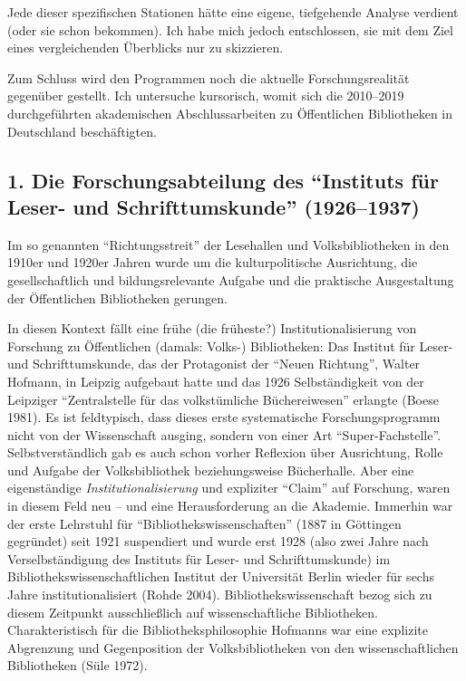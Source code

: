 \documentclass[a4paper,
fontsize=11pt,
oneside,
numbers=noperiodatend,
parskip=half-,
bibliography=totoc,
final
]{scrartcl}
\begin{document}
Jede dieser spezifischen Stationen hätte eine eigene, tiefgehende
Analyse verdient (oder sie schon bekommen). Ich habe mich jedoch
entschlossen, sie mit dem Ziel eines vergleichenden Überblicks nur zu
skizzieren.

Zum Schluss wird den Programmen noch die aktuelle Forschungsrealität
gegenüber gestellt. Ich untersuche kursorisch, womit sich die 2010--2019
durchgeführten akademischen Abschlussarbeiten zu Öffentlichen
Bibliotheken in Deutschland beschäftigten.

\hypertarget{die-forschungsabteilung-des-instituts-fuxfcr-leser--und-schrifttumskunde-19261937}{%
\subsection{\texorpdfstring{1. Die Forschungsabteilung des
\enquote{Instituts für Leser- und Schrifttumskunde}
(1926--1937)}{1. Die Forschungsabteilung des ``Instituts für Leser- und Schrifttumskunde'' (1926--1937)}}\label{die-forschungsabteilung-des-instituts-fuxfcr-leser--und-schrifttumskunde-19261937}}

Im so genannten \enquote{Richtungsstreit} der Lesehallen und
Volksbibliotheken in den 1910er und 1920er Jahren wurde um die
kulturpolitische Ausrichtung, die gesellschaftlich und bildungsrelevante
Aufgabe und die praktische Ausgestaltung der Öffentlichen Bibliotheken
gerungen.

In diesen Kontext fällt eine frühe (die früheste?) Institutionalisierung
von Forschung zu Öffentlichen (damals: Volks-) Bibliotheken: Das
Institut für Leser- und Schrifttumskunde, das der Protagonist der
\enquote{Neuen Richtung}, Walter Hofmann, in Leipzig aufgebaut hatte und
das 1926 Selbständigkeit von der Leipziger \enquote{Zentralstelle für
das volkstümliche Büchereiwesen} erlangte (Boese 1981). Es ist
feldtypisch, dass dieses erste systematische Forschungsprogramm nicht
von der Wissenschaft ausging, sondern von einer Art
\enquote{Super-Fachstelle}. Selbstverständlich gab es auch schon vorher
Reflexion über Ausrichtung, Rolle und Aufgabe der Volksbibliothek
beziehungsweise Bücherhalle. Aber eine eigenständige
\emph{Institutionalisierung} und expliziter \enquote{Claim} auf
Forschung, waren in diesem Feld neu -- und eine Herausforderung an die
Akademie. Immerhin war der erste Lehrstuhl für
\enquote{Bibliothekswissenschaften} (1887 in Göttingen gegründet) seit
1921 suspendiert und wurde erst 1928 (also zwei Jahre nach
Verselbständigung des Instituts für Leser- und Schrifttumskunde) im
Bibliothekswissenschaftlichen Institut der Universität Berlin wieder für
sechs Jahre institutionalisiert (Rohde 2004). Bibliothekswissenschaft
bezog sich zu diesem Zeitpunkt ausschließlich auf wissenschaftliche
Bibliotheken. Charakteristisch für die Bibliotheksphilosophie Hofmanns
war eine explizite Abgrenzung und Gegenposition der Volksbibliotheken
von den wissenschaftlichen Bibliotheken (Süle 1972).
\end{document}
